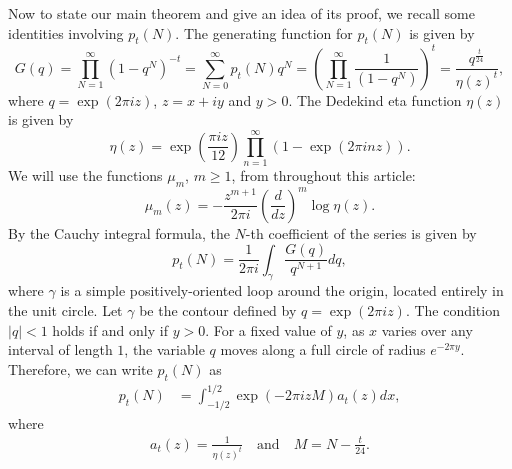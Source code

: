 \documentclass[11pt]{amsart}
\theoremstyle{plain}
\numberwithin{equation}{section}
\begin{document}
	Now to state our main theorem and give an idea of its proof, we recall some identities involving $p_t(N)$. 
	The generating function for $p_{t}(N)$ is given by
	\begin{equation*}
		G(q)=\prod_{N=1}^\infty \left(1-q^{N}\right)^{-t}=\sum_{N=0}^{\infty}p_t(N)q^{N}=\left(\prod_{N=1}^\infty \frac{1}{\left(1-q^{N}\right)}\right)^{t}=\frac{q^{\frac{t}{24}}}{\eta(z)^{t}}, 
	\end{equation*}
	where $q=\exp(2\pi iz)$, $z=x+iy$ and $y>0$. The Dedekind eta function $\eta(z)$ is given by 
	\begin{equation*}
		\eta(z)=\exp\left(\frac{\pi iz}{12}\right)\prod_{n=1}^{\infty}(1-\exp(2\pi inz)).  
	\end{equation*}
	We will use the functions $\mu_m$, $m\ge 1$, from \cite{tyler2026asymptotics} throughout this article:
	\begin{equation}\label{eq-muk}
		\mu_{m}(z)=-\frac{z^{m+1}}{2\pi i} \left(\frac{d}{dz}\right)^{m} \log\eta(z).
	\end{equation}
	By the Cauchy integral formula, the $N$-th coefficient of the series is given by
	\begin{equation*}
		p_{t}(N)=\frac{1}{2\pi i}\int_{\gamma}\frac{G(q)}{q^{N+1}}dq, 
	\end{equation*}
	where $\gamma$ is a simple positively-oriented loop around the origin, located entirely in the unit circle. Let $\gamma$ be the contour defined by $q=\exp(2\pi i z)$. The condition $|q|<1$ holds if and only if $y>0$. For a fixed value of $y$, as $x$ varies over any interval of length $1$, the variable $q$ moves along a full circle of radius $e^{-2\pi y}$. Therefore, we can write $p_t(N)$ as
	\begin{align}\label{eq-integral}
		p_{t}(N)&=\int_{-1/2}^{1/2} \exp\left( -2\pi izM\right)a_{t}(z)dx,
	\end{align}
	where 
	\begin{align*}%
		a_{t}(z)=\frac{1}{\eta(z)^{t}}\quad\text{and}\quad M=N-\frac{t}{24}.
	\end{align*}	
	
\end{document}
